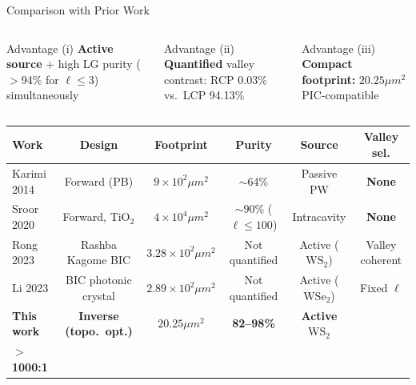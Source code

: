 \documentclass[aspectratio=169, 10pt]{beamer}
\newcommand{\red}[1]{\textcolor{accentred}{\textbf{#1}}}
\begin{document}

\begin{frame}{Comparison with Prior Work}

  \centering\small\renewcommand{\arraystretch}{1.25}

\begin{columns}[T]
      \begin{exampleblock}{\centering Advantage (i)}
        \centering\footnotesize \textbf{Active source} + high LG purity ($>$94\% for $\ell\le3$) simultaneously
      \end{exampleblock}
      \begin{exampleblock}{\centering Advantage (ii)}
        \centering\footnotesize \textbf{Quantified} valley contrast: RCP 0.03\% vs.\ LCP 94.13\%
      \end{exampleblock}
      \begin{exampleblock}{\centering Advantage (iii)}
        \centering\footnotesize \textbf{Compact footprint:} $20.25 \mu m^2$ PIC-compatible
      \end{exampleblock}
  \end{columns}
  \vspace{4pt}
  \begin{tabular}{lccccc}
    \toprule
    \textbf{Work} & \textbf{Design} & Footprint & \textbf{Purity} & \textbf{Source} & \textbf{Valley sel.} \\
    \midrule
    Karimi 2014 & Forward (PB)      & $9 \times 10^2 \mu m^2$ & $\sim$64\%  & Passive PW & \red{None} \\
    Sroor 2020  & Forward, $\text{TiO}_2$  & $4 \times 10^4 \mu m^2$ & $\sim90\%$ ($\ell\!\le\!100$) & Intracavity & \red{None} \\
    Rong 2023 & Rashba Kagome BIC & $3.28 \times 10^2 \mu m^2$ & Not quantified & Active ($\text{WS}_2$) & Valley coherent \\
    Li 2023     & BIC photonic crystal & $2.89 \times 10^2 \mu m^2$ & Not quantified & Active ($\text{WSe}_2$) & Fixed $\ell$ \\
    \midrule
    \rowcolor{NYCUblue!15}
    \textbf{This work} & \textbf{Inverse (topo.\ opt.)} & $20.25 \mu m^2$ & \textbf{82--98\%} & \textbf{Active $\text{WS}_2$} & \makecell{\textbf{Valley coherent} \\ \textcolor{green!60!black}{\textbf{$>$1000:1}}} \\
    \bottomrule
  \end{tabular}
\end{frame}
\end{document}
